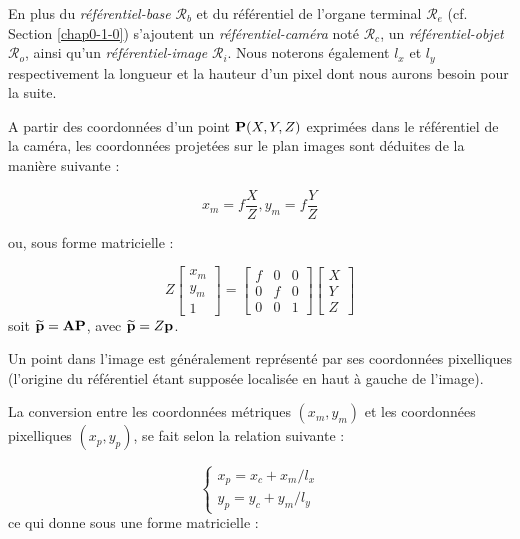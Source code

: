 En plus du {\it référentiel-base} $\mathcal R_b$ et du r\'ef\'erentiel de 
l'organe terminal $\mathcal R_e$ (cf. Section \ref{chap0-1-0}) s'ajoutent un 
{\it référentiel-caméra} noté $\mathcal R_c$, un {\it référentiel-objet} 
$\mathcal R_o$, ainsi qu'un {\it référentiel-image} $\mathcal R_i$. Nous 
noterons également $l_x$ et $l_y$ respectivement la longueur et la hauteur d'un 
pixel dont nous aurons besoin pour la suite.

A partir des coordonnées d'un point ${\bf P}(X, Y, Z)$ exprimées dans le 
référentiel de la caméra, les coordonnées projetées sur le plan images sont 
déduites de la manière suivante :

\begin{equation}
x_m = f \frac{X}{Z}, y_m = f \frac{Y}{Z}
\label{intro:eq12}
\end{equation}

ou, sous forme matricielle :

\begin{equation}
Z
\begin{bmatrix}
x_m \\y_m \\ 1
\end{bmatrix}
=
\begin{bmatrix}
f & 0 & 0 \\ 0 & f & 0 \\ 0 & 0 & 1 
\end{bmatrix}
\begin{bmatrix}
X \\ Y \\ Z 
\end{bmatrix}
\label{intro:eq13}
\end{equation}
soit $\widetilde {\bf p} = {\bf A}{\bf P}$, avec $\widetilde {\bf p} = Z {\bf 
p}$.

Un point dans l'image est généralement représenté par ses coordonnées 
pi\-xelliques (l'origine du référentiel étant supposée localisée en haut à 
gauche de l'image).

La conversion entre les coordonnées métriques $(x_m, y_m)$ et les coordonnées 
pixelliques $(x_p, y_p)$, se fait selon la relation suivante :

\begin{equation}
\left \lbrace
\begin{matrix}
x_p = x_c + x_m/l_x \\
y_p = y_c + y_m/l_y
\end{matrix} \right .
\label{intro:eq14}
\end{equation}
ce qui donne sous une forme matricielle :

